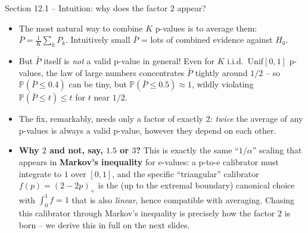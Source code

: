 \documentclass[aspectratio=169,10pt]{beamer}
\newcommand{\PP}{\mathbb{P}}
\begin{document}
\begin{frame}{Section 12.1 -- Intuition: why does the factor $2$ appear?}
  \begin{itemize}
    \item The most natural way to combine $K$ p-values is to average them: $\bar P = \tfrac1K\sum_k P_k$. Intuitively small $\bar P$ = lots of combined evidence against $H_0$.
    \item But $\bar P$ itself is \emph{not} a valid p-value in general! Even for $K$ i.i.d.\ $\mathrm{Unif}[0,1]$ p-values, the law of large numbers concentrates $\bar P$ tightly around $1/2$ -- so $\PP(\bar P\le0.4)$ can be tiny, but $\PP(\bar P\le0.5)\approx1$, wildly violating $\PP(\bar P\le t)\le t$ for $t$ near $1/2$.
    \item The fix, remarkably, needs only a factor of exactly $2$: \emph{twice} the average of any p-values is always a valid p-value, however they depend on each other.
    \item \textbf{Why $2$ and not, say, $1.5$ or $3$?} This is exactly the same ``$1/\alpha$'' scaling that appears in \textbf{Markov's inequality} for e-values: a p-to-e calibrator must integrate to $1$ over $[0,1]$, and the specific ``triangular'' calibrator $f(p)=(2-2p)_+$ is the (up to the extremal boundary) canonical choice with $\int_0^1 f=1$ that is also \emph{linear}, hence compatible with averaging. Chasing this calibrator through Markov's inequality is precisely how the factor $2$ is born -- we derive this in full on the next slides.
  \end{itemize}
\end{frame}
\end{document}
